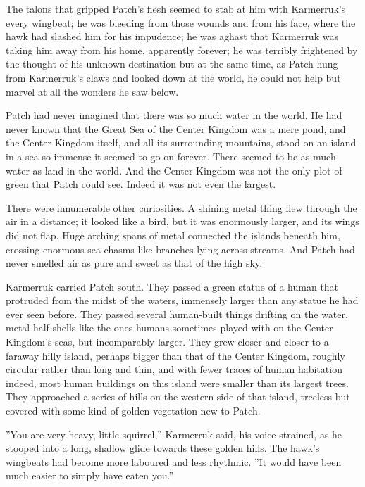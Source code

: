 \documentclass[12pt]{book}
\begin{document}
 The talons that gripped Patch's flesh seemed to stab at him with Karmerruk's every wingbeat; he was bleeding from those wounds and from his face, where the hawk had slashed him for his impudence; he was aghast that Karmerruk was taking him away from his home, apparently forever; he was terribly frightened by the thought of his unknown destination %
 but at the same time, as Patch hung from Karmerruk's claws and looked down at the world, he could not help but marvel at all the wonders he saw below.\par
Patch had never imagined that there was so much water in the world. He had never known that the Great Sea of the Center Kingdom was a mere pond, and the Center Kingdom itself, and all its surrounding mountains, stood on an island in a sea so immense it seemed to go on forever. There seemed to be as much water as land in the world. And the Center Kingdom was not the only plot of green that Patch could see. Indeed it was not even the largest.\par
There were innumerable other curiosities. A shining metal thing flew through the air in a distance; it looked like a bird, but it was enormously larger, and its wings did not flap. Huge arching spans of metal connected the islands beneath him, crossing enormous sea-chasms like branches lying across streams. And Patch had never smelled air as pure and sweet as that of the high sky.\par
Karmerruk carried Patch south. They passed a green statue of a human that protruded from the midst of the waters, immensely larger than any statue he had ever seen before. They passed several human-built things drifting on the water, metal half-shells like the ones humans sometimes played with on the Center Kingdom's seas, but incomparably larger. They grew closer and closer to a faraway hilly island, perhaps bigger than that of the Center Kingdom, roughly circular rather than long and thin, and with fewer traces of human habitation %
 indeed, most human buildings on this island were smaller than its largest trees. They approached a series of hills on the western side of that island, treeless but covered with some kind of golden vegetation new to Patch.\par
''You are very heavy, little squirrel,'' Karmerruk said, his voice strained, as he stooped into a long, shallow glide towards these golden hills. The hawk's wingbeats had become more laboured and less rhythmic. ''It would have been much easier to simply have eaten you.''\par
\end{document}
